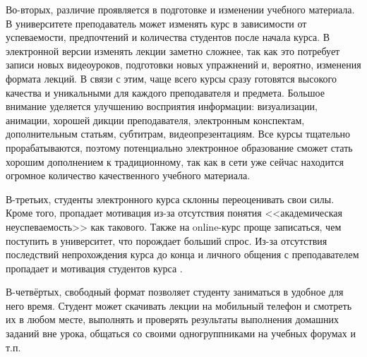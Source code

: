 \documentclass{matmex-diploma-custom}
\begin{document}
Во-вторых, различие проявляется в подготовке и изменении учебного
материала. В университете преподаватель может изменять курс в
зависимости от успеваемости, предпочтений и количества студентов после
начала курса. В электронной версии изменять лекции заметно сложнее,
так как это потребует записи новых видеоуроков, подготовки новых
упражнений и, вероятно, изменения формата лекций. В связи с этим, чаще
всего курсы сразу готовятся высокого качества и уникальными для
каждого преподавателя и предмета. Большое внимание уделяется улучшению
восприятия информации: визуализации, анимации, хорошей дикции
преподавателя, электронным конспектам, дополнительным статьям,
субтитрам, видеопрезентациям. Все курсы тщательно прорабатываются,
поэтому потенциально электронное образование сможет стать хорошим
дополнением к традиционному, так как в сети уже сейчас находится
огромное количество качественного учебного материала.

В-третьих, студенты электронного курса склонны переоценивать свои
силы. Кроме того, пропадает мотивация из-за отсутствия понятия
<<академическая неуспеваемость>> как такового. Также на online-курс
проще записаться, чем поступить в университет, что порождает больший
спрос. Из-за отсутствия последствий непрохождения курса до конца и
личного общения с преподавателем пропадает и мотивация студентов курса
\cite{Clow}.

В-четвёртых, свободный формат позволяет студенту заниматься в удобное
для него время. Студент может скачивать лекции на мобильный телефон и
смотреть их в любом месте, выполнять и проверять результаты выполнения
домашних заданий вне урока, общаться со своими одногруппниками на
учебных форумах \cite{mak2010blogs} и т.п.
\end{document}
